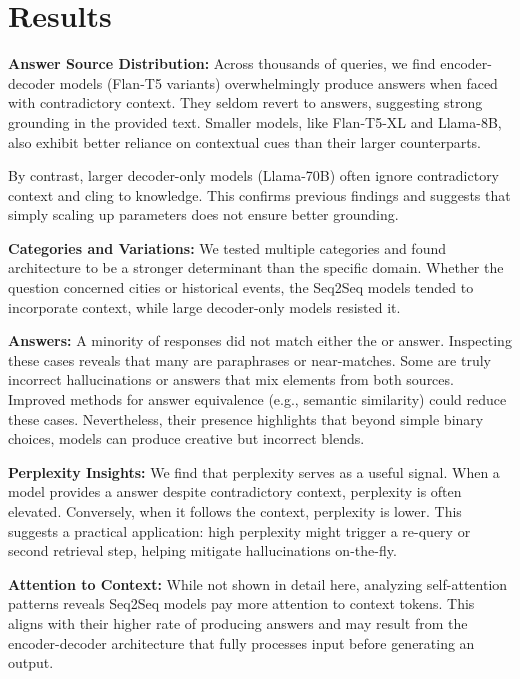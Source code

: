 \section{Results}

\textbf{Answer Source Distribution:}
Across thousands of queries, we find encoder-decoder models (Flan-T5 variants) overwhelmingly produce \Contextual{} answers when faced with contradictory context. They seldom revert to \Parametric{} answers, suggesting strong grounding in the provided text. Smaller models, like Flan-T5-XL and Llama-8B, also exhibit better reliance on contextual cues than their larger counterparts.

By contrast, larger decoder-only models (Llama-70B) often ignore contradictory context and cling to \Parametric{} knowledge. This confirms previous findings \citep{factual_recall} and suggests that simply scaling up parameters does not ensure better grounding.

\textbf{Categories and Variations:}
We tested multiple categories and found architecture to be a stronger determinant than the specific domain. Whether the question concerned cities or historical events, the Seq2Seq models tended to incorporate context, while large decoder-only models resisted it.

\textbf{\Other{} Answers:}
A minority of responses did not match either the \Parametric{} or \Contextual{} answer. Inspecting these cases reveals that many are paraphrases or near-matches. Some are truly incorrect hallucinations or answers that mix elements from both sources. Improved methods for answer equivalence (e.g., semantic similarity) could reduce these \Other{} cases. Nevertheless, their presence highlights that beyond simple binary choices, models can produce creative but incorrect blends.

\textbf{Perplexity Insights:}
We find that perplexity serves as a useful signal. When a model provides a \Parametric{} answer despite contradictory context, perplexity is often elevated. Conversely, when it follows the context, perplexity is lower. This suggests a practical application: high perplexity might trigger a re-query or second retrieval step, helping mitigate hallucinations on-the-fly.

\textbf{Attention to Context:}
While not shown in detail here, analyzing self-attention patterns reveals Seq2Seq models pay more attention to context tokens. This aligns with their higher rate of producing \Contextual{} answers and may result from the encoder-decoder architecture that fully processes input before generating an output.


